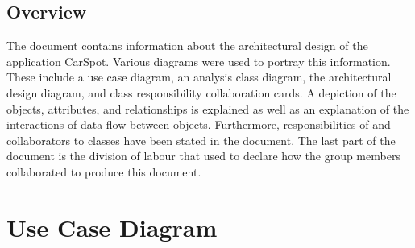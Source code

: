 \documentclass[12pt]{article}
\begin{document}
\subsection{Overview}
\label{sub:overview}
	The document contains information about the architectural design of the application CarSpot. Various diagrams were used to portray this information. These include a use case diagram, an analysis class diagram, the architectural design diagram, and class responsibility collaboration cards. A depiction of the objects, attributes, and relationships is explained as well as an explanation of the interactions of data flow between objects. Furthermore, responsibilities of and collaborators to classes have been stated in the document. The last part of the document is the division of labour that used to declare how the group members collaborated to produce this document.


\section{Use Case Diagram}
\label{sec:use_case_diagram}
\end{document}
